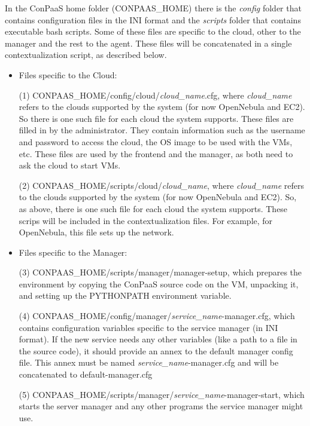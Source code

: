\documentclass[10pt]{article}
\begin{document}
In the ConPaaS home folder (\textdollar CONPAAS\_HOME) there is the \textit{config} folder that contains configuration files in the INI format and the \textit{scripts} folder that contains executable bash scripts. Some of these files are specific to the cloud, other to the manager and the rest to the agent. These files will be concatenated in a single contextualization script, as described below.

\begin{itemize}
\item Files specific to the Cloud:

(1) \textdollar CONPAAS\_HOME/config/cloud/\textit{cloud\_name}.cfg, where \textit{cloud\_name} refers to the clouds supported by the system (for now OpenNebula and EC2). So there is one such file for each cloud the system supports. These files are filled in by the administrator. They contain information such as the username and password to access the cloud, the OS image to be used with the VMs, etc. These files are used by the frontend and the manager, as both need to ask the cloud to start VMs. 

(2) \textdollar CONPAAS\_HOME/scripts/cloud/\textit{cloud\_name}, where \textit{cloud\_name} refers to the clouds supported by the system (for now OpenNebula and EC2). So, as above, there is one such file for each cloud the system supports. These scrips will be included in the contextualization files. For example, for OpenNebula, this file sets up the network. 

\item Files specific to the Manager:

(3) \textdollar CONPAAS\_HOME/scripts/manager/manager-setup, which prepares the environment by copying the ConPaaS source code on the VM, unpacking it, and setting up the PYTHONPATH environment variable.

(4) \textdollar CONPAAS\_HOME/config/manager/\textit{service\_name}-manager.cfg, which contains configuration variables specific to the service manager (in INI format). If the new service needs any other variables (like a path to a file in the source code), it should provide an annex to the default manager config file. This annex must be named \textit{service\_name}-manager.cfg and will be concatenated to default-manager.cfg

(5) \textdollar CONPAAS\_HOME/scripts/manager/\textit{service\_name}-manager-start, which starts the server manager and any other programs the service manager might use. 


\end{itemize}
\end{document}
